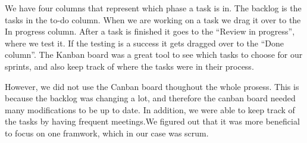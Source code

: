 We have four columns that represent which phase a task is in. The backlog is the tasks in the to-do column. When we are working on a task we drag it over to the In progress column. After a task is finished it goes to the “Review in progress”, where we test it. If the testing is a success it gets dragged over to the “Done column”. The Kanban board was a great tool to see which tasks to choose for our sprints, and also keep track of where the tasks were in their process.

However, we did not use the Canban board thoughout the whole prosess. This is because the backlog was changing a lot, and therefore the canban board needed many modifications to be up to date. In addition, we were able to keep track of the tasks by having frequent meetings.We figured out that it was more beneficial to focus on one framwork, which in our case was scrum. 